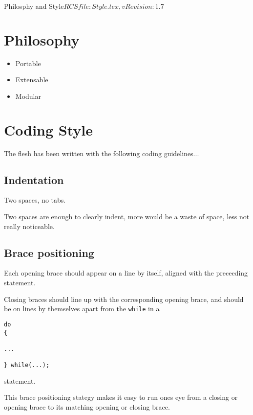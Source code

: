 %   
\begin{cactuspart}{1}{Philosphy and Style}{$RCSfile: Style.tex,v $}{$Revision: 1.7 $}
\renewcommand{\thepage}{\Alph{part}\arabic{page}}

\chapter{Philosophy} 

\begin{itemize}
\item
Portable
\item
Extensable
\item
Modular
\end{itemize}

\chapter{Coding Style}

The flesh has been written with the following coding guidelines...


\section{Indentation}

Two spaces, no tabs.

Two spaces are enough to clearly indent, more would be a waste of
space, less not really noticeable.

\section{Brace positioning}

Each opening brace should appear on a line by itself,
aligned with the preceeding statement.

Closing braces should line up with the corresponding
opening brace, and should be on lines by themselves
apart from the {\tt while} in a 
%
\begin{verbatim}
do
{

...

} while(...);

\end{verbatim}
%
statement.

This brace positioning stategy makes it easy to run ones eye from a closing
or opening brace to its matching opening or closing brace.


\end{cactuspart}
